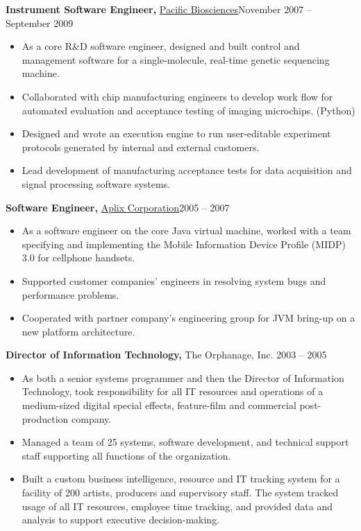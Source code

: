 \documentclass{article}
\begin{document}
{\bf Instrument Software Engineer,} \href{http://www.pacb.com/}{Pacific Biosciences}\hfill November 2007 -- September 2009
\begin{itemize} \itemsep -2pt
    
	\item As a core R\&D software engineer, designed and built control and management software for a single-molecule, real-time genetic sequencing machine.
	
	\item Collaborated with chip manufacturing engineers to develop work flow for automated evaluation and acceptance testing of imaging microchips. (Python)
    
    \item Designed and wrote an execution engine to run user-editable experiment protocols generated by internal and external customers.
    
    \item Lead development of manufacturing acceptance tests for data acquisition and signal processing software systems.
    
\end{itemize}

{\bf Software Engineer,} \href{http://www.aplix.co.jp/en/}{Aplix Corporation}\hfill 2005 -- 2007
\begin{itemize} \itemsep -2pt
    
	\item As a software engineer on the core Java virtual machine, worked with a team specifying and implementing the Mobile Information Device Profile (MIDP) 3.0 for cellphone handsets.
	
	\item Supported customer companies' engineers in resolving system bugs and performance problems.
	
	\item Cooperated with partner company's engineering group for JVM bring-up on a new platform architecture.
    
\end{itemize}

{\bf Director of Information Technology,} The Orphanage, Inc. \hfill 2003 -- 2005
\begin{itemize} \itemsep -2pt

	\item As both a senior systems programmer and then the Director of Information Technology, took responsibility for all IT resources and operations of a medium-sized digital special effects, feature-film and commercial post-production company.
	
	\item Managed a team of 25 systems, software development, and technical support staff supporting all functions of the organization.
    
	\item Built a custom business intelligence, resource and IT tracking system for a facility of 200 artists, producers and supervisory staff. The system tracked usage of all IT resources, employee time tracking, and provided data and analysis to support executive decision-making.

\end{itemize}
\end{document}
